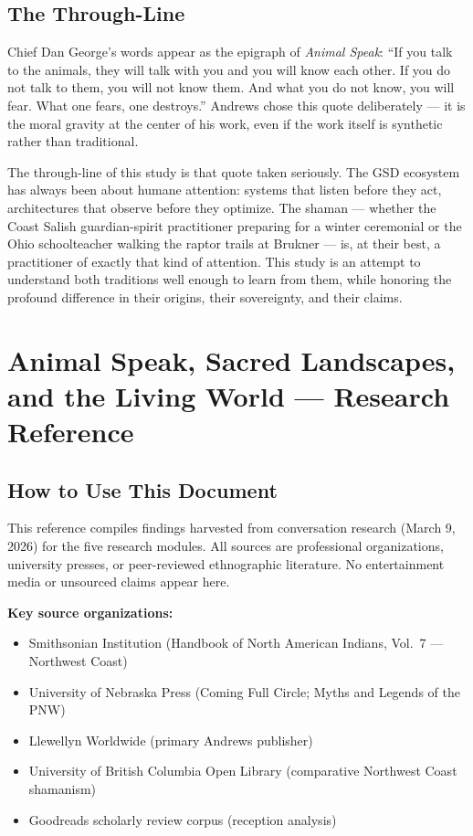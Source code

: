 \documentclass[11pt,letterpaper]{article}
\newcommand{\stageheader}[2]{%
  \noindent\colorbox{#2}{\makebox[\textwidth][l]{%
    \textcolor{white}{\bfseries\sffamily\hspace{6pt}#1\hspace{6pt}}}}%
  \vspace{0.5em}\par%
}
\begin{document}
\subsection{The Through-Line}

Chief Dan George's words appear as the epigraph of \emph{Animal Speak}: ``If you talk to the animals, they will talk with you and you will know each other. If you do not talk to them, you will not know them. And what you do not know, you will fear. What one fears, one destroys.'' Andrews chose this quote deliberately --- it is the moral gravity at the center of his work, even if the work itself is synthetic rather than traditional.

The through-line of this study is that quote taken seriously. The GSD ecosystem has always been about humane attention: systems that listen before they act, architectures that observe before they optimize. The shaman --- whether the Coast Salish guardian-spirit practitioner preparing for a winter ceremonial or the Ohio schoolteacher walking the raptor trails at Brukner --- is, at their best, a practitioner of exactly that kind of attention. This study is an attempt to understand both traditions well enough to learn from them, while honoring the profound difference in their origins, their sovereignty, and their claims.

\newpage

\stageheader{STAGE 2 --- RESEARCH REFERENCE}{secondary}

\section{Animal Speak, Sacred Landscapes, and the Living World --- Research Reference}

\subsection{How to Use This Document}

This reference compiles findings harvested from conversation research (March 9, 2026) for the five research modules. All sources are professional organizations, university presses, or peer-reviewed ethnographic literature. No entertainment media or unsourced claims appear here.

\textbf{Key source organizations:}
\begin{itemize}[noitemsep]
  \item Smithsonian Institution (Handbook of North American Indians, Vol.\ 7 --- Northwest Coast)
  \item University of Nebraska Press (Coming Full Circle; Myths and Legends of the PNW)
  \item Llewellyn Worldwide (primary Andrews publisher)
  \item University of British Columbia Open Library (comparative Northwest Coast shamanism)
  \item Goodreads scholarly review corpus (reception analysis)
\end{itemize}
\end{document}
